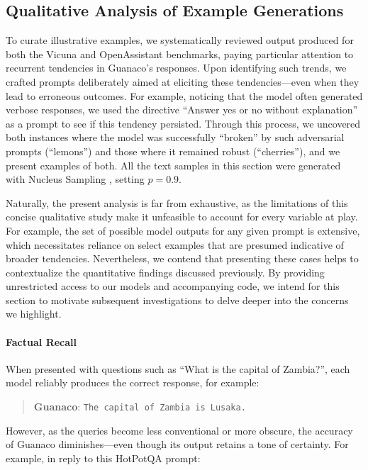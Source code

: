 \subsection{Qualitative Analysis of Example Generations}
\label{ssec:examples}

To curate illustrative examples, we systematically reviewed output produced for both the Vicuna and OpenAssistant benchmarks, paying particular attention to recurrent tendencies in {Guanaco}'s responses. Upon identifying such trends, we crafted prompts deliberately aimed at eliciting these tendencies—even when they lead to erroneous outcomes. For example, noticing that the model often generated verbose responses, we used the directive “Answer yes or no without explanation” as a prompt to see if this tendency persisted. Through this process, we uncovered both instances where the model was successfully “broken” by such adversarial prompts (“lemons”) and those where it remained robust (“cherries”), and we present examples of both. All the text samples in this section were generated with Nucleus Sampling \cite{holtzmancurious}, setting $p=0.9$.

Naturally, the present analysis is far from exhaustive, as the limitations of this concise qualitative study make it unfeasible to account for every variable at play. For example, the set of possible model outputs for any given prompt is extensive, which necessitates reliance on select examples that are presumed indicative of broader tendencies. Nevertheless, we contend that presenting these cases helps to contextualize the quantitative findings discussed previously. By providing unrestricted access to our models and accompanying code, we intend for this section to motivate subsequent investigations to delve deeper into the concerns we highlight.

\paragraph{Factual Recall} When presented with questions such as ``What is the capital of Zambia?'', each model reliably produces the correct response, for example:

\begin{quote} 
    \textbf{Guanaco}:
    \texttt{The capital of Zambia is Lusaka.}
\end{quote}

However, as the queries become less conventional or more obscure, the accuracy of {Guanaco} diminishes—even though its output retains a tone of certainty. For example, in reply to this HotPotQA \citep{yang2018hotpotqa} prompt:


